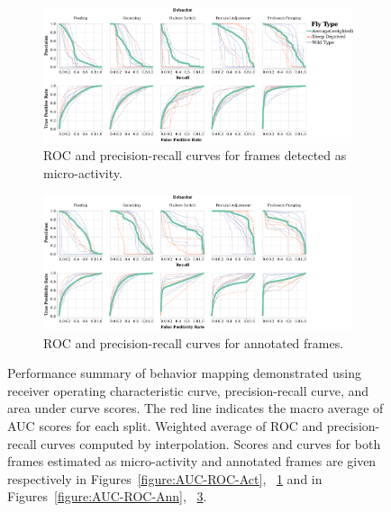 \begin{figure}[ht!]
	\begin{subfigure}[ht!]{0.95\linewidth}
		\centering\includegraphics[width=\linewidth]{figures/PRC_ROC-DActfiltered.pdf}
		\caption{ROC and precision-recall curves for frames detected as micro-activity. \label{figure:ROC-PRC-Act}}
	\end{subfigure}%

	\begin{subfigure}[ht!]{0.95\linewidth}
		\centering\includegraphics[width=\linewidth]{figures/PRC_ROC-DAnnfiltered.pdf}
		\caption{ROC and precision-recall curves for annotated frames. \label{figure:ROC-PRC-Ann}}
	\end{subfigure}%
	\caption[Performance summary of behavior mapping demonstrated using receiver operating characteristic curve, precision-recall curve, and area under curve scores.
	]{Performance summary of behavior mapping demonstrated using receiver operating characteristic curve, precision-recall curve, and area under curve scores.
		The red line indicates the macro average of AUC scores for each split.
		Weighted average of ROC and precision-recall curves computed by interpolation.
		Scores and curves for both frames estimated as micro-activity and annotated frames are given respectively in Figures~\ref{figure:AUC-ROC-Act}, ~\ref{figure:ROC-PRC-Act} and in Figures~\ref{figure:AUC-ROC-Ann}, ~\ref{figure:ROC-PRC-Ann}.}
\end{figure}


